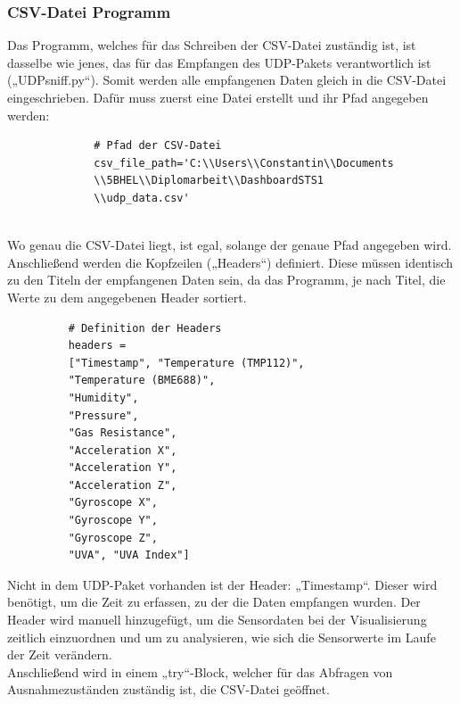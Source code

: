 \subsubsection{CSV-Datei Programm}
Das Programm, welches für das Schreiben der CSV-Datei zuständig ist, ist dasselbe wie jenes, das für das Empfangen des UDP-Pakets verantwortlich ist („UDPsniff.py“). Somit werden alle empfangenen Daten gleich in die CSV-Datei eingeschrieben. Dafür muss zuerst eine Datei erstellt und ihr Pfad angegeben werden:
\vspace{3mm}
\begin{figure}[H]
	\centering
	\begin{verbatim}
		# Pfad der CSV-Datei
		csv_file_path='C:\\Users\\Constantin\\Documents
		\\5BHEL\\Diplomarbeit\\DashboardSTS1
		\\udp_data.csv'
		
	\end{verbatim}
\end{figure}
Wo genau die CSV-Datei liegt, ist egal, solange der genaue Pfad angegeben wird. \\
Anschließend werden die Kopfzeilen („Headers“) definiert. Diese müssen identisch zu den Titeln der empfangenen Daten sein, da das Programm, je nach Titel, die Werte zu dem angegebenen Header sortiert.
\vspace{3mm}
\begin{figure}[H]
	\centering
	\begin{verbatim}
	# Definition der Headers
	headers = 
	["Timestamp", "Temperature (TMP112)",
	"Temperature (BME688)", 
	"Humidity", 
	"Pressure",
	"Gas Resistance", 
	"Acceleration X", 
	"Acceleration Y", 
	"Acceleration Z",
	"Gyroscope X", 
	"Gyroscope Y", 
	"Gyroscope Z", 
	"UVA", "UVA Index"]	
	\end{verbatim}
\end{figure}
Nicht in dem UDP-Paket vorhanden ist der Header: „Timestamp“. Dieser wird benötigt, um die Zeit zu erfassen, zu der die Daten empfangen wurden. Der Header wird manuell hinzugefügt, um die Sensordaten bei der Visualisierung zeitlich einzuordnen und um zu analysieren, wie sich die Sensorwerte im Laufe der Zeit verändern. \\
\vspace{3mm}
Anschließend wird in einem „try“-Block, welcher für das Abfragen von Ausnahmezuständen zuständig ist, die CSV-Datei geöffnet.
